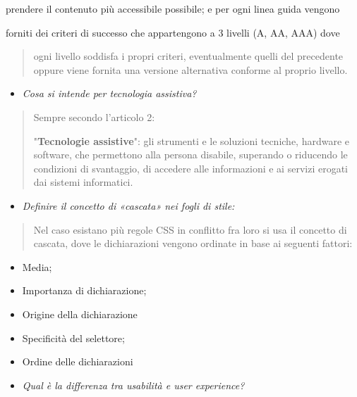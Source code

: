 prendere il contenuto più accessibile possibile; e per ogni linea guida
vengono

forniti dei criteri di successo che appartengono a 3 livelli (A, AA,
AAA) dove

\begin{quote}
ogni livello soddisfa i propri criteri, eventualmente quelli del
precedente oppure viene fornita una versione alternativa conforme al
proprio livello.
\end{quote}

\begin{itemize}
\item
  \emph{Cosa si intende per tecnologia assistiva?}
\end{itemize}

\begin{quote}
Sempre secondo l'articolo 2:

"\textbf{Tecnologie assistive}": gli strumenti e le soluzioni tecniche,
hardware e software, che permettono alla persona disabile, superando o
riducendo le condizioni di svantaggio, di accedere alle informazioni e
ai servizi erogati dai sistemi informatici.
\end{quote}

\begin{itemize}
\item
  \emph{Definire il concetto di «cascata» nei fogli di stile:}
\end{itemize}

\begin{quote}
Nel caso esistano più regole CSS in conflitto fra loro si usa il
concetto di cascata, dove le dichiarazioni vengono ordinate in base ai
seguenti fattori:
\end{quote}

\begin{itemize}
\item
  Media;
\item
  Importanza di dichiarazione;
\item
  Origine della dichiarazione
\item
  Specificità del selettore;
\item
  Ordine delle dichiarazioni
\end{itemize}

\begin{itemize}
\item
  \emph{Qual è la differenza tra usabilità e user experience?}
\end{itemize}

